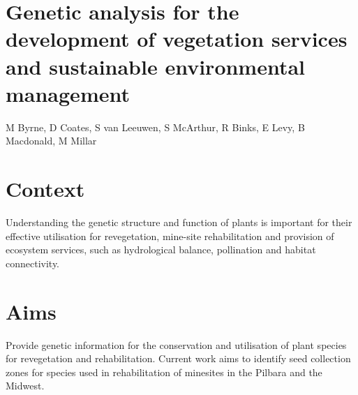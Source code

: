\documentclass[version=last,
    paper=a4, %
    10pt, %
    usenames,
    dvipsnames,
    oneside, %
    headings=openany, %
    DIV=15 %
]{scrbook}
\begin{document}
\section*{Genetic analysis for the development of vegetation services and
sustainable environmental management
}

M Byrne, D Coates, S van Leeuwen, S McArthur, R Binks, E Levy, B
Macdonald, M Millar


\section*{Context}
Understanding the genetic structure and function of plants is important
for their effective utilisation for revegetation, mine-site
rehabilitation and provision of ecosystem services, such as hydrological
balance, pollination and habitat connectivity.



\section*{Aims}
Provide genetic information for the conservation and utilisation of
plant species for revegetation and rehabilitation. Current work aims to
identify seed collection zones for species used in rehabilitation of
minesites in the Pilbara and the Midwest.
\end{document}
